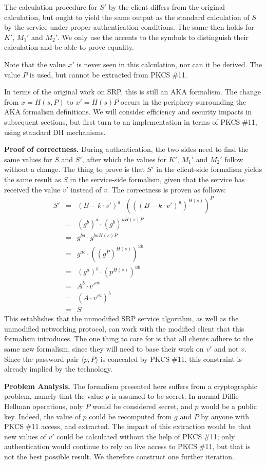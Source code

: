 \documentclass[a4paper,11pt]{article}
\def\pkcs11{PKCS$\;$\#11\xspace}
\begin{document}
The calculation procedure for $S'$ by the client differs from the original calculation, but ought to yield the same output as the standard calculation of $S$ by the service under proper authentication conditions.  The same then holds for $K'$, $M_1'$ and $M_2'$.  We only use the accents to the symbols to distinguish their calculation and be able to prove equality.

Note that the value $x'$ is never seen in this calculation, nor can it be derived.  The value $P$ is used, but cannot be extracted from \pkcs11.

In terms of the original work on SRP, this is still an AKA formalism.  The change from $x=H(s,P)$ to $x'=H(s) P$ occurs in the periphery surrounding the AKA formalism definitions.  We will consider efficiency and security impacts in subsequent sections, but first turn to an implementation in terms of \pkcs11, using standard DH mechanisms.

\textbf{Proof of correctness.}
During authentication, the two sides need to find the same values for $S$ and $S'$, after which the values for $K'$, $M_1'$ and $M_2'$ follow without a change.  The thing to prove is that $S'$ in the client-side formalism yields the same result as $S$ in the service-side formalism, given that the service has received the value $v'$ instead of $v$.  The correctness is proven as follows:
\begin{eqnarray*}
S' &=& (B-k\cdot v')^a\cdot (((B-k\cdot v')^u)^{H(s)})^P\\
&=& (g^b)^a\cdot (g^b)^{uH(s)P}\\
&=& g^{ba}\cdot g^{buH(s)P}\\
&=& g^{ab}\cdot ((g^P)^{H(s)})^{ub}\\
&=& (g^a)^b\cdot (p^{H(s)})^{ub}\\
&=& A^b\cdot {v'}^{ub}\\
&=& (A\cdot v'^u)^b\\
&=& S
\end{eqnarray*}
This establishes that the unmodified SRP service algorithm, as well as the unmodified networking protocol, can work with the modified client that this formalism introduces.  The one thing to care for is that all clients adhere to the same new formalism, since they will need to base their work on $v'$ and not $v$.  Since the password pair $\langle p,P\rangle$ is concealed by \pkcs11, this constraint is already implied by the technology.

\textbf{Problem Analysis.}
The formalism presented here suffers from a cryptographic problem, namely that the value $p$ is assumed to be secret.  In normal Diffie-Hellman operations, only $P$ would be considered secret, and $p$ would be a public key.  Indeed, the value of $p$ could be recomputed from $g$ and $P$ by anyone with \pkcs11 access, and extracted.  The impact of this extraction would be that new values of $v'$ could be calculated without the help of \pkcs11; only authentication would continue to rely on live access to \pkcs11, but that is not the best possible result.  We therefore construct one further iteration.
\end{document}
